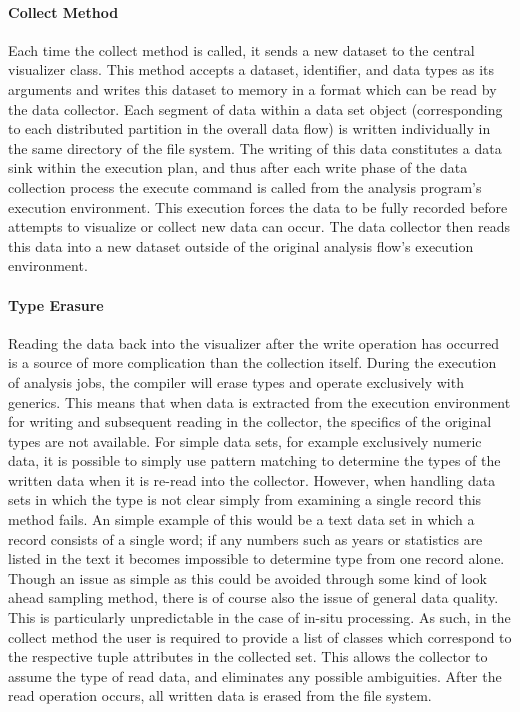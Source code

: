 \paragraph{Collect Method}
Each time the collect method is called, it sends a new dataset to the central visualizer class. This method accepts a dataset, identifier, and data types as its  arguments and writes this dataset to memory in a format which can be read by the data collector. Each segment of data within a data set object (corresponding to each distributed partition in the overall data flow) is written individually in the same directory of the file system. The writing of this data constitutes a data sink within the execution plan, and thus after each write phase of the data collection process the execute command is called from the analysis program's execution environment. This execution forces the data to be fully recorded before attempts to visualize or collect new data can occur. The data collector then reads this data into a new dataset outside of the original analysis flow's execution environment.

\paragraph{Type Erasure}
Reading the data back into the visualizer after the write operation has occurred is a source of more complication than the collection itself. During the execution of analysis jobs, the compiler will erase types and operate exclusively with generics. This means that when data is extracted from the execution environment for writing and subsequent reading in the collector, the specifics of the original types are not available. For simple data sets, for example exclusively numeric data, it is possible to simply use pattern matching to determine the types of the written data when it is re-read into the collector. However, when handling data sets in which the type is not clear simply from examining a single record this method fails. An simple example of this would be a text data set in which a record consists of a single word; if any numbers such as years or statistics are listed in the text it becomes impossible to determine type from one record alone. Though an issue as simple as this could be avoided through some kind of look ahead sampling method, there is of course also the issue of general data quality. This is particularly unpredictable in the case of in-situ processing. As such, in the collect method the user is required to provide a list of classes which correspond to the respective tuple attributes in the collected set. This allows the collector to assume the type of read data, and eliminates any possible ambiguities. After the read operation occurs, all written data is erased from the file system. 
  
